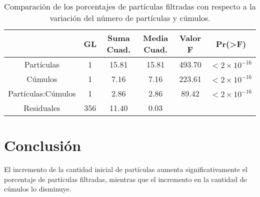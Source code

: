 \documentclass{article}
\begin{document}
\begin{table}[h]
\begin{center}
\caption{Comparación de los porcentajes de partículas filtradas con respecto a la variación del número de partículas y cúmulos.}
\label{anova}
\begin{tabular}{c c c c c c}
\hline
 &\textbf{GL}&\textbf{Suma Cuad.}&\textbf{Media Cuad.}&\textbf{Valor F}&\textbf{Pr(>F)}\\
\hline
Partículas&1&15.81&15.81&493.70&$<2\times10^{-16}$\\
Cúmulos&1&7.16&7.16&223.61&$<2\times10^{-16}$\\
Partículas:Cúmulos&1&2.86&2.86&89.42&$<2\times10^{-16}$\\
Residuales&356&11.40&0.03\\
\hline
\end{tabular}
\end{center}
\end{table}

\section{Conclusión}
El incremento de la cantidad inicial de partículas aumenta significativamente el porcentaje de partículas filtradas, mientras que el incremento en la cantidad de cúmulos lo disminuye.



\end{document}
